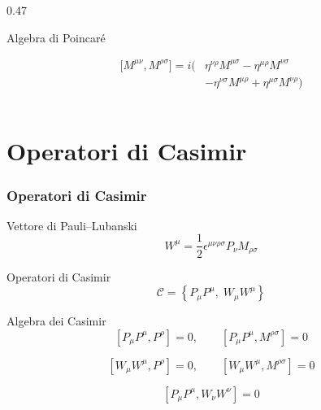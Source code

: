 \documentclass[11pt,t,aspectratio=169]{beamer}
\begin{document}
\begin{frame}[t]
\begin{columns}[T,onlytextwidth]
\begin{column}{0.47\textwidth}
\begin{block}{Algebra di Poincaré}
\begin{minipage}[t][0.45\textheight][t]{\linewidth}
                    \[
                        \begin{aligned}
                        \bigl[M^{\mu\nu},M^{\rho\sigma}\bigr]
                        =
                        i\bigl(
                        &\eta^{\nu\rho}M^{\mu\sigma}
                        -
                        \eta^{\mu\rho}M^{\nu\sigma}
                        \\
                        &-
                        \eta^{\nu\sigma}M^{\mu\rho}
                        +
                        \eta^{\mu\sigma}M^{\nu\rho}
                        \bigr)
                        \end{aligned}
                    \]

                \end{minipage}

            \end{block}

        \end{column}

    \end{columns}

\end{frame}



\section{Operatori di Casimir}

\begin{frame}[c]
    \frametitle{Operatori di Casimir}

    \begin{block}{Vettore di Pauli--Lubanski}
        \[
            W^\mu
            =
            \frac{1}{2}
            \epsilon^{\mu\nu\rho\sigma}
            P_\nu M_{\rho\sigma}
        \]
    \end{block}

    \begin{exampleblock}{Operatori di Casimir}
        \[
            \mathcal{C}
            =
            \left\{
                P_\mu P^\mu,
                \;
                W_\mu W^\mu
            \right\}
        \]
    \end{exampleblock}

    \begin{block}{Algebra dei Casimir}
        \[
            [P_\mu P^\mu,P^\rho]=0,
            \qquad
            [P_\mu P^\mu,M^{\rho\sigma}]=0
        \]

        \[
            [W_\mu W^\mu,P^\rho]=0,
            \qquad
            [W_\mu W^\mu,M^{\rho\sigma}]=0
        \]

        \[
            [P_\mu P^\mu,W_\nu W^\nu]=0
        \]
    \end{block}

\end{frame}
\end{document}
